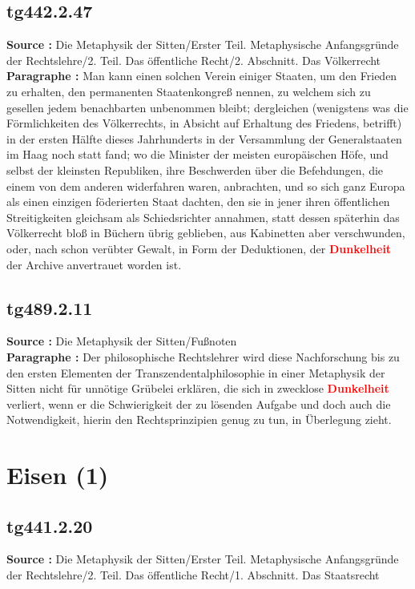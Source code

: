 \documentclass[a4paper,12pt,twoside]{book}
\newcommand{\match}[1]{\textcolor{red}{\textbf{#1}}}
\newcommand{\unnumberedsection}[1]{
	\section*{#1}
	\addcontentsline{toc}{section}{#1}
	\markright{#1}
}
\begin{document}
	\subsection*{tg442.2.47} 
	\textbf{Source : }Die Metaphysik der Sitten/Erster Teil. Metaphysische Anfangsgründe der Rechtslehre/2. Teil. Das öffentliche Recht/2. Abschnitt. Das Völkerrecht\\  
	
	\textbf{Paragraphe : }Man kann einen solchen Verein einiger Staaten, um den Frieden zu erhalten, den permanenten Staatenkongreß nennen, zu welchem sich zu gesellen jedem benachbarten unbenommen bleibt; dergleichen (wenigstens was die Förmlichkeiten des Völkerrechts, in Absicht auf Erhaltung des Friedens, betrifft) in der ersten Hälfte dieses Jahrhunderts in der Versammlung der Generalstaaten im Haag noch statt fand; wo die Minister der meisten europäischen Höfe, und selbst der kleinsten Republiken, ihre Beschwerden  über die Befehdungen, die einem von dem anderen widerfahren waren, anbrachten, und so sich ganz Europa als einen einzigen föderierten Staat dachten, den sie in jener ihren öffentlichen Streitigkeiten gleichsam als Schiedsrichter annahmen, statt dessen späterhin das Völkerrecht bloß in Büchern übrig geblieben, aus Kabinetten aber verschwunden, oder, nach schon verübter Gewalt, in Form der Deduktionen, der \match{Dunkelheit} der Archive anvertrauet worden ist. 
	
	\subsection*{tg489.2.11} 
	\textbf{Source : }Die Metaphysik der Sitten/Fußnoten\\  
	
	\textbf{Paragraphe : }Der philosophische Rechtslehrer wird diese Nachforschung bis zu den ersten Elementen der Transzendentalphilosophie in einer Metaphysik der Sitten nicht für unnötige Grübelei erklären, die sich in zwecklose \match{Dunkelheit} verliert, wenn er die Schwierigkeit der zu lösenden Aufgabe und doch auch die Notwendigkeit, hierin den Rechtsprinzipien genug zu tun, in Überlegung zieht. 
	
	\unnumberedsection{Eisen (1)} 
	\subsection*{tg441.2.20} 
	\textbf{Source : }Die Metaphysik der Sitten/Erster Teil. Metaphysische Anfangsgründe der Rechtslehre/2. Teil. Das öffentliche Recht/1. Abschnitt. Das Staatsrecht\\  
	
\end{document}
